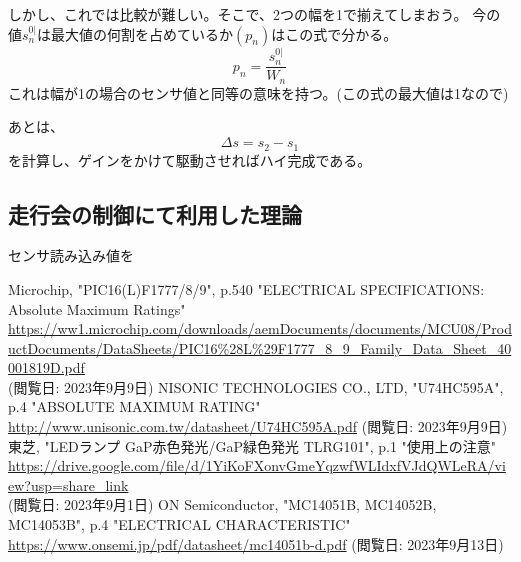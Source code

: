 \documentclass[a4paper]{ltjsarticle}
\begin{document}
しかし、これでは比較が難しい。そこで、2つの幅を1で揃えてしまおう。
今の値$s^{0|}_{n}$は最大値の何割を占めているか$(p_n)$はこの式で分かる。
\begin{equation}
  p_n=\frac{s^{0|}_n}{W_n}
\end{equation}
これは幅が1の場合のセンサ値と同等の意味を持つ。(この式の最大値は1なので)

あとは、
\begin{equation}
  \Delta s = s_2-s_1
\end{equation}
を計算し、ゲインをかけて駆動させればハイ完成である。

\subsection{走行会の制御にて利用した理論}
センサ読み込み値を

\begin{thebibliography}{200}
  Microchip, "PIC16(L)F1777/8/9", p.540 "ELECTRICAL SPECIFICATIONS: Absolute Maximum Ratings" \\ \url{https://ww1.microchip.com/downloads/aemDocuments/documents/MCU08/ProductDocuments/DataSheets/PIC16%28L%29F1777_8_9_Family_Data_Sheet_40001819D.pdf} \\ (閲覧日: 2023年9月9日)
  NISONIC TECHNOLOGIES CO., LTD, "U74HC595A", p.4 "ABSOLUTE MAXIMUM RATING"  \\ \url{http://www.unisonic.com.tw/datasheet/U74HC595A.pdf} (閲覧日: 2023年9月9日)
  東芝, "LEDランプ GaP赤色発光/GaP緑色発光 TLRG101", p.1 "使用上の注意" \\ \url{https://drive.google.com/file/d/1YiKoFXonvGmeYqzwfWLIdxfVJdQWLeRA/view?usp=share_link} \\ (閲覧日: 2023年9月1日)
  ON Semiconductor, "MC14051B, MC14052B, MC14053B", p.4 "ELECTRICAL CHARACTERISTIC" \\ \url{https://www.onsemi.jp/pdf/datasheet/mc14051b-d.pdf} (閲覧日: 2023年9月13日)
\end{thebibliography}

\end{document}
